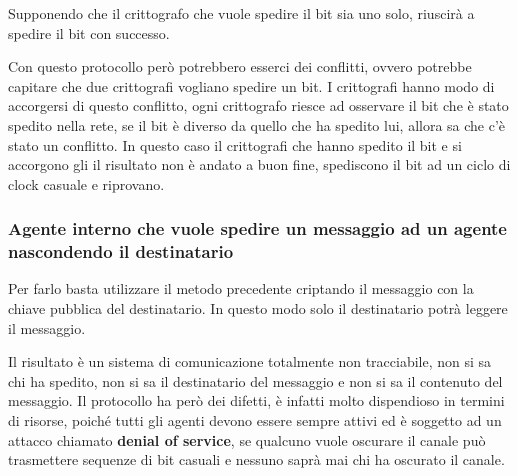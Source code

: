 Supponendo che il crittografo che vuole spedire il bit sia uno solo, riuscirà a spedire il bit
con successo.

Con questo protocollo però potrebbero esserci dei conflitti, ovvero potrebbe capitare che due
crittografi vogliano spedire un bit. I crittografi hanno modo di accorgersi di questo conflitto,
ogni crittografo riesce ad osservare il bit che è stato spedito nella rete, se il bit è diverso
da quello che ha spedito lui, allora sa che c'è stato un conflitto. In questo caso il crittografi 
che hanno spedito il bit e si accorgono gli il risultato non è andato a buon fine,
spediscono il bit ad un ciclo di clock casuale e riprovano.

\subsubsection{Agente interno che vuole spedire un messaggio ad un agente nascondendo il destinatario}
Per farlo basta utilizzare il metodo precedente criptando il messaggio con la chiave pubblica del
destinatario. In questo modo solo il destinatario potrà leggere il messaggio.

Il risultato è un sistema di comunicazione totalmente non tracciabile, non si sa chi ha spedito, 
non si sa il destinatario del messaggio e non si sa il contenuto del messaggio.
Il protocollo ha però dei difetti, è infatti molto dispendioso in termini di risorse, poiché 
tutti gli agenti devono essere sempre attivi ed è soggetto ad un attacco chiamato \textbf{denial of service},
se qualcuno vuole oscurare il canale può trasmettere
sequenze di bit casuali e nessuno saprà mai chi ha oscurato il canale.
